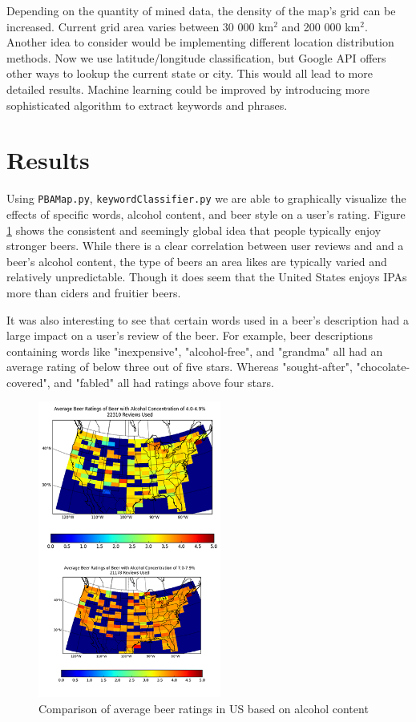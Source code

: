 \documentclass[10pt]{IEEEtran}
\begin{document}
Depending on the quantity of mined data, the density of the map's grid can be increased. Current grid area varies between 30 000 km$^2$ and 200 000 km$^2$. Another idea to consider would be implementing different location distribution methods. Now we use latitude/longitude classification, but Google API offers other ways to lookup the current state or city. This would all lead to more detailed results. Machine learning could be improved by introducing more sophisticated algorithm to extract keywords and phrases. 

\section{Results}

 Using \texttt{PBAMap.py}, \texttt{keywordClassifier.py} we are able to graphically visualize the effects of specific words, alcohol content, and beer style on a user's rating. Figure \ref{fig:abvcomp} shows the consistent and seemingly global idea that people typically enjoy stronger beers. While there is a clear correlation between user reviews and and a beer's alcohol content, the type of beers an area likes are typically varied and relatively unpredictable. Though it does seem that the United States enjoys IPAs more than ciders and fruitier beers.

It was also interesting to see that certain words used in a beer's description had a large impact on a user's review of the beer. For example, beer descriptions containing words like "inexpensive", "alcohol-free", and "grandma" all had an average rating of below three out of five stars. Whereas "sought-after", "chocolate-covered", and "fabled" all had ratings above four stars.

\begin{figure}[t]
  \centering
  \includegraphics[width=6cm]{./graphics/abvComp.png}
  \caption{Comparison of average beer ratings in US based on alcohol content}
  \label{fig:abvcomp}
\end{figure}
\end{document}
